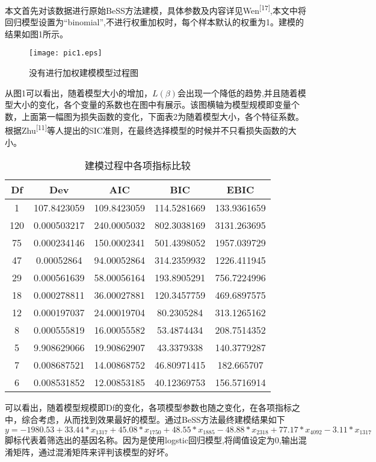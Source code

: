 \documentclass[
]{ctexart}
\begin{document}
本文首先对该数据进行原始BeSS方法建模，具体参数及内容详见Wen\textsuperscript{{[}17{]}},本文中将回归模型设置为``binomial'',不进行权重加权时，每个样本默认的权重为1。建模的结果如图1所示。

\begin{figure}[h]  
\centering  
\texttt{[image: pic1.eps]}  
\caption{没有进行加权建模模型过程图}  
\label{建模过程图}  
\end{figure}

从图1可以看出，随着模型大小的增加，\(L(\beta)\)会出现一个降低的趋势,并且随着模型大小的变化，各个变量的系数也在图中有展示。该图横轴为模型规模即变量个数，上面第一幅图为损失函数的变化，下面表2为随着模型大小，各个特征系数。根据Zhu\textsuperscript{{[}11{]}}等人提出的SIC准则，在最终选择模型的时候并不只看损失函数的大小。

\begin{table}[htb]
\centering
\caption{ 建模过程中各项指标比较}
\begin{tabular}{ccccc}
\hline
Df  & Dev         & AIC         & BIC         & EBIC        \\ \hline
1   & 107.8423059 & 109.8423059 & 114.5281669 & 133.9361659 \\
120 & 0.000503217 & 240.0005032 & 802.3038169 & 3131.263695 \\
75  & 0.000234146 & 150.0002341 & 501.4398052 & 1957.039729 \\
47  & 0.00052864  & 94.00052864 & 314.2359932 & 1226.411945 \\
29  & 0.000561639 & 58.00056164 & 193.8905291 & 756.7224996 \\
18  & 0.000278811 & 36.00027881 & 120.3457759 & 469.6897575 \\
12  & 0.000197037 & 24.00019704 & 80.2305284  & 313.1265162 \\
8   & 0.000555819 & 16.00055582 & 53.4874434  & 208.7514352 \\
5   & 9.908629066 & 19.90862907 & 43.3379338  & 140.3779287 \\
7   & 0.008687521 & 14.00868752 & 46.80971415 & 182.665707  \\
6   & 0.008531852 & 12.00853185 & 40.12369753 & 156.5716914 \\ \hline
\end{tabular}
\end{table}

可以看出，随着模型规模即Df的变化，各项模型参数也随之变化，在各项指标之中，综合考虑，从而找到效果最好的模型。通过BeSS方法最终建模结果如下
\[
y=-1980.53+33.44*x_{1317}+45.08*x_{1750}+48.55*x_{1885}-48.88*x_{2318}+77.17*x_{4092}-3.11*x_{1317}
\]
脚标代表着筛选出的基因名称。因为是使用logstic回归模型,将阈值设定为0,输出混淆矩阵，通过混淆矩阵来评判该模型的好坏。
\end{document}
